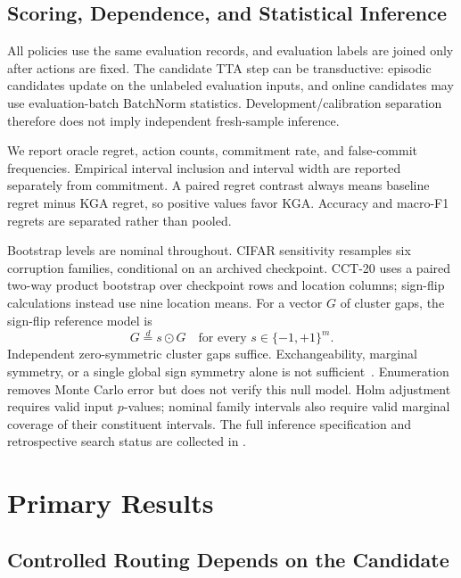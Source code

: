 \subsection{Scoring, Dependence, and Statistical Inference}
\label{sec:compact-inference-units}

All policies use the same evaluation records, and evaluation labels are joined only after actions
are fixed. The candidate TTA step can be transductive: episodic candidates update on the unlabeled
evaluation inputs, and online candidates may use evaluation-batch BatchNorm statistics.
Development/calibration separation therefore does not imply independent fresh-sample inference.

We report oracle regret, action counts, commitment rate, and false-commit frequencies. Empirical
interval inclusion and interval width are reported separately from commitment.
A paired regret contrast always means baseline regret minus KGA regret, so positive values favor
KGA. Accuracy and macro-F1 regrets are separated rather than pooled.

Bootstrap levels are nominal throughout. CIFAR sensitivity resamples six corruption families,
conditional on an archived checkpoint. CCT-20 uses a paired two-way product bootstrap over
checkpoint rows and location columns; sign-flip calculations instead use nine location means.
For a vector $G$ of cluster gaps, the sign-flip reference model is
\begin{equation}
 G\overset{d}{=}s\odot G
 \quad\text{for every }s\in\{-1,+1\}^{m}.
 \label{eq:compact-signflip-null}
\end{equation}
Independent zero-symmetric cluster gaps suffice. Exchangeability, marginal symmetry, or a single
global sign symmetry alone is not sufficient~\cite{hemerik2018exact}. Enumeration removes Monte
Carlo error but does not verify this null model. Holm adjustment requires valid input $p$-values;
nominal family intervals also require valid marginal coverage of their constituent intervals.
The full inference specification and retrospective search status are collected in
.

\section{Primary Results}
\label{sec:compact-results}

\subsection{Controlled Routing Depends on the Candidate}

